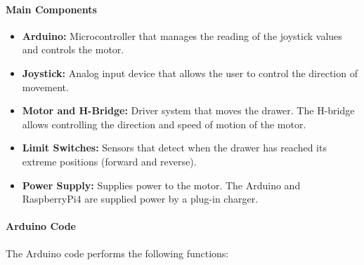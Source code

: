     
    
    \paragraph{\textbf{Main Components}
    }
    \begin{itemize}
        \item \textbf{Arduino:} Microcontroller that manages the reading of the joystick values and controls the motor.
        \item \textbf{Joystick:} Analog input device that allows the user to control the direction of movement.
        \item \textbf{Motor and H-Bridge:} Driver system that moves the drawer. The H-bridge allows controlling the direction and speed of motion of the motor.
        \item \textbf{Limit Switches:} Sensors that detect when the drawer has reached its extreme positions (forward and reverse).
        \item \textbf{Power Supply:} Supplies power to the motor. The Arduino and RaspberryPi4 are supplied power by a plug-in charger.
    \end{itemize}
    
    
    \paragraph{\textbf{Arduino Code}
    }
    
    The Arduino code performs the following functions:
    
